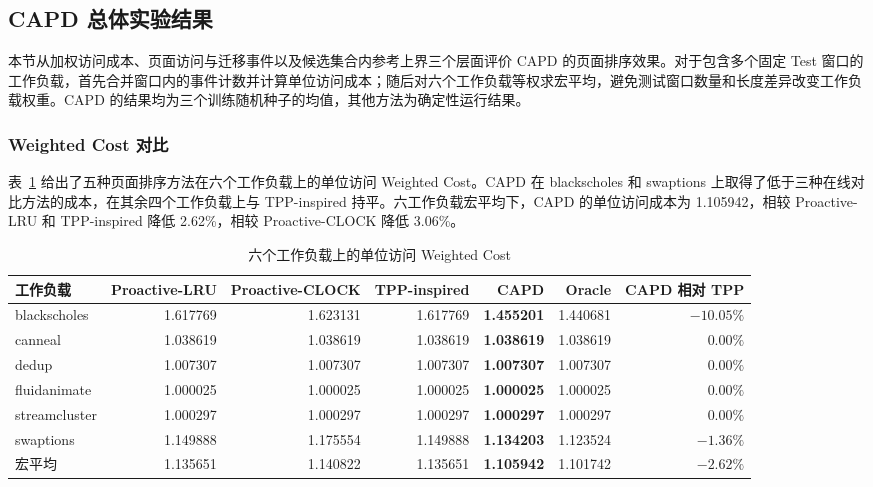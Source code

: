 \subsection{\heiti CAPD 总体实验结果}

本节从加权访问成本、页面访问与迁移事件以及候选集合内参考上界三个层面评价 CAPD 的页面排序效果。对于包含多个固定 Test 窗口的工作负载，首先合并窗口内的事件计数并计算单位访问成本；随后对六个工作负载等权求宏平均，避免测试窗口数量和长度差异改变工作负载权重。CAPD 的结果均为三个训练随机种子的均值，其他方法为确定性运行结果。

\subsubsection{\heiti Weighted Cost 对比}

表~\ref{tab:capd-workload-cost} 给出了五种页面排序方法在六个工作负载上的单位访问 Weighted Cost。CAPD 在 blackscholes 和 swaptions 上取得了低于三种在线对比方法的成本，在其余四个工作负载上与 TPP-inspired 持平。六工作负载宏平均下，CAPD 的单位访问成本为 1.105942，相较 Proactive-LRU 和 TPP-inspired 降低 2.62\%，相较 Proactive-CLOCK 降低 3.06\%。

\begin{table}[htbp]
  \centering
  \scriptsize
  \caption{六个工作负载上的单位访问 Weighted Cost}
  \label{tab:capd-workload-cost}
  \renewcommand{\arraystretch}{1.15}
  \setlength{\tabcolsep}{2.8pt}
  \begin{tabular}{lrrrrrr}
    \toprule
    工作负载 & Proactive-LRU & Proactive-CLOCK & TPP-inspired & CAPD & Oracle & CAPD 相对 TPP \\
    \midrule
    blackscholes  & 1.617769 & 1.623131 & 1.617769 & \textbf{1.455201} & 1.440681 & $-10.05\%$ \\
    canneal       & 1.038619 & 1.038619 & 1.038619 & \textbf{1.038619} & 1.038619 & $0.00\%$ \\
    dedup         & 1.007307 & 1.007307 & 1.007307 & \textbf{1.007307} & 1.007307 & $0.00\%$ \\
    fluidanimate  & 1.000025 & 1.000025 & 1.000025 & \textbf{1.000025} & 1.000025 & $0.00\%$ \\
    streamcluster & 1.000297 & 1.000297 & 1.000297 & \textbf{1.000297} & 1.000297 & $0.00\%$ \\
    swaptions     & 1.149888 & 1.175554 & 1.149888 & \textbf{1.134203} & 1.123524 & $-1.36\%$ \\
    \midrule
    宏平均         & 1.135651 & 1.140822 & 1.135651 & \textbf{1.105942} & 1.101742 & $-2.62\%$ \\
    \bottomrule
  \end{tabular}
\end{table}

